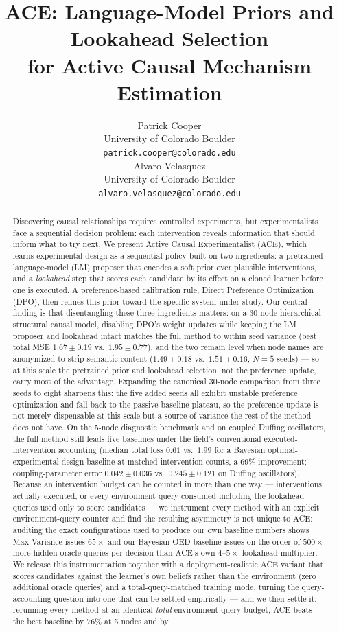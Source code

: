\documentclass{article}
\title{ACE: Language-Model Priors and Lookahead Selection\\for Active Causal Mechanism Estimation}
\author{%
  Patrick Cooper\\
  University of Colorado Boulder\\
  \texttt{patrick.cooper@colorado.edu}\\
  \And
  Alvaro Velasquez\\
  University of Colorado Boulder\\
  \texttt{alvaro.velasquez@colorado.edu}\\
}
\theoremstyle{plain}
\theoremstyle{definition}
\theoremstyle{remark}
\begin{document}
\maketitle

\begin{abstract}
Discovering causal relationships requires controlled experiments, but experimentalists face a sequential decision problem: each intervention reveals information that should inform what to try next. We present Active Causal Experimentalist (ACE), which learns experimental design as a sequential policy built on two ingredients: a pretrained language-model (LM) proposer that encodes a soft prior over plausible interventions, and a \emph{lookahead} step that scores each candidate by its effect on a cloned learner before one is executed. A preference-based calibration rule, Direct Preference Optimization (DPO), then refines this prior toward the specific system under study. Our central finding is that disentangling these three ingredients matters: on a 30-node hierarchical structural causal model, disabling DPO's weight updates while keeping the LM proposer and lookahead intact matches the full method to within seed variance (best total MSE $1.67\pm0.19$ vs.\ $1.95\pm0.77$), and the two remain level when node names are anonymized to strip semantic content ($1.49\pm0.18$ vs.\ $1.51\pm0.16$, $N{=}5$ seeds) --- so at this scale the pretrained prior and lookahead selection, not the preference update, carry most of the advantage. Expanding the canonical 30-node comparison from three seeds to eight sharpens this: the five added seeds all exhibit unstable preference optimization and fall back to the passive-baseline plateau, so the preference update is not merely dispensable at this scale but a source of variance the rest of the method does not have. On the 5-node diagnostic benchmark and on coupled Duffing oscillators, the full method still leads five baselines under the field's conventional executed-intervention accounting (median total loss $0.61$ vs.\ $1.99$ for a Bayesian optimal-experimental-design baseline at matched intervention counts, a $69\%$ improvement; coupling-parameter error $0.042\pm0.036$ vs.\ $0.245\pm0.121$ on Duffing oscillators). Because an intervention budget can be counted in more than one way --- interventions actually executed, or every environment query consumed including the lookahead queries used only to score candidates --- we instrument every method with an explicit environment-query counter and find the resulting asymmetry is not unique to ACE: auditing the exact configurations used to produce our own baseline numbers shows Max-Variance issues $65\times$ and our Bayesian-OED baseline issues on the order of $500\times$ more hidden oracle queries per decision than ACE's own $4$--$5\times$ lookahead multiplier. We release this instrumentation together with a deployment-realistic ACE variant that scores candidates against the learner's own beliefs rather than the environment (zero additional oracle queries) and a total-query-matched training mode, turning the query-accounting question into one that can be settled empirically --- and we then settle it: rerunning every method at an identical \emph{total} environment-query budget, ACE beats the best baseline by $76\%$ at 5 nodes and by 
\end{abstract}
\end{document}
